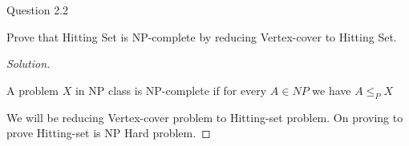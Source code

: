 \begin{solution}{Question 2.2}\label{ques:22}
    \begin{question}
    Prove that Hitting Set is NP-complete by reducing Vertex-cover to Hitting Set.
    \end{question}
    \tcblower{}
    \begin{proof}[Solution]
    
    \begin{claim}
    A problem $X$ in NP class is NP-complete if for every $A \in NP$ we have $A \leq_P X$
    \end{claim}
    We will be reducing Vertex-cover problem to Hitting-set problem. On proving  to prove Hitting-set is NP Hard problem.
    \end{proof}
\end{solution}
